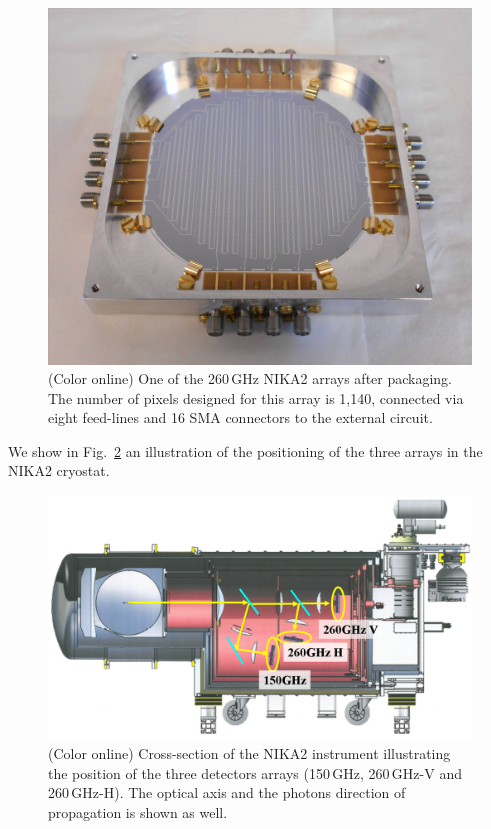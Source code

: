 \documentclass[]{aa} %
\begin{document}
\begin{figure}[h]
   \centering
    \includegraphics[width=.95\linewidth]{1mm_array.jpg}
      \caption{(Color online) One of the 260\,GHz NIKA2 arrays after packaging. The number of pixels designed for this array is 1,140, connected via eight feed-lines and 16 SMA connectors to the external circuit.}
         \label{Array}
\end{figure}

We show in Fig.~\ref{Cryostat} an illustration of the positioning of the three arrays in the NIKA2 cryostat.
 
\begin{figure}[h]
   \centering
   \includegraphics[width=.95\linewidth]{Fig1_cryo.png}
      \caption{(Color online) Cross-section of the NIKA2 instrument illustrating the position of the three detectors arrays (150\,GHz, 260\,GHz-V and 260\,GHz-H). The optical axis and the photons direction of propagation is shown as well.}
         \label{Cryostat}
\end{figure}
\end{document}
